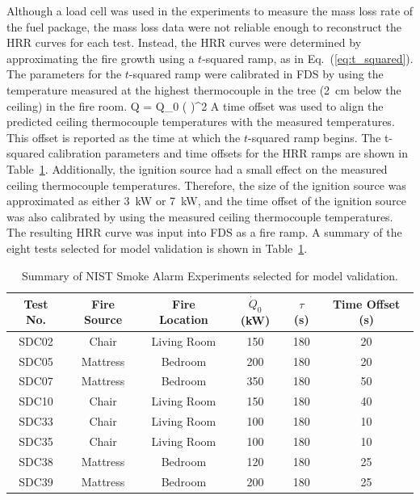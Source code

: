 Although a load cell was used in the experiments to measure the mass loss rate of the fuel package, the mass loss data were not reliable enough to reconstruct the HRR curves for each test. Instead, the HRR curves were determined by approximating the fire growth using a $t$-squared ramp, as in Eq.~(\ref{eq:t_squared}). The parameters for the $t$-squared ramp were calibrated in FDS by using the temperature measured at the highest thermocouple in the tree (2~cm below the ceiling) in the fire room.
\be
\dot Q = \dot Q_0 \left(  \right)^2
\label{eq:t_squared}
\ee
A time offset was used to align the predicted ceiling thermocouple temperatures with the measured temperatures. This offset is reported as the time at which the $t$-squared ramp begins. The t-squared calibration parameters and time offsets for the HRR ramps are shown in Table~\ref{tab:NIST_Smoke_Alarms_Summary}. Additionally, the ignition source had a small effect on the measured ceiling thermocouple temperatures. Therefore, the size of the ignition source was approximated as either 3~kW or 7~kW, and the time offset of the ignition source was also calibrated by using the measured ceiling thermocouple temperatures. The resulting HRR curve was input into FDS as a fire ramp. A summary of the eight tests selected for model validation is shown in Table~\ref{tab:NIST_Smoke_Alarms_Summary}.

\begin{table}[h!]
\caption{Summary of NIST Smoke Alarm Experiments selected for model validation.}
\begin{center}
\begin{tabular}{|c|c|c|c|c|c|}
\hline
Test No.  &  Fire Source  &  Fire Location  &  $\dot Q_0$ (kW)  &  $\tau$ (s)  &  Time Offset (s)  \\ \hline \hline
SDC02     &  Chair        &  Living Room    &  150              &  180         &  20               \\ \hline
SDC05     &  Mattress     &  Bedroom        &  200              &  180         &  20               \\ \hline
SDC07     &  Mattress     &  Bedroom        &  350              &  180         &  50               \\ \hline
SDC10     &  Chair        &  Living Room    &  150              &  180         &  40               \\ \hline
SDC33     &  Chair        &  Living Room    &  100              &  180         &  10               \\ \hline
SDC35     &  Chair        &  Living Room    &  100              &  180         &  10               \\ \hline
SDC38     &  Mattress     &  Bedroom        &  120              &  180         &  25               \\ \hline
SDC39     &  Mattress     &  Bedroom        &  200              &  180         &  25               \\ \hline
\end{tabular}
\end{center}
\label{tab:NIST_Smoke_Alarms_Summary}
\end{table}


